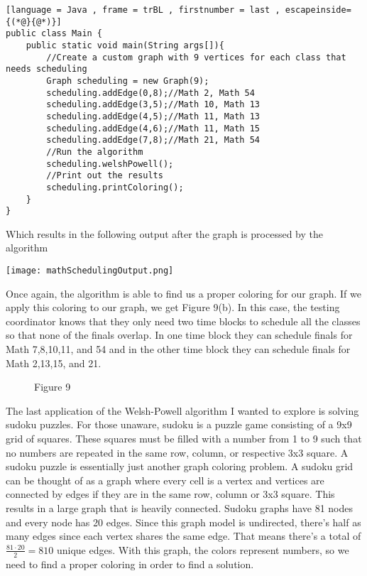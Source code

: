 \documentclass[12pt, letterpaper]{article}
\begin{document}
\begin{lstlisting}[language = Java , frame = trBL , firstnumber = last , escapeinside={(*@}{@*)}]
public class Main {
    public static void main(String args[]){
        //Create a custom graph with 9 vertices for each class that needs scheduling
        Graph scheduling = new Graph(9);
        scheduling.addEdge(0,8);//Math 2, Math 54
        scheduling.addEdge(3,5);//Math 10, Math 13
        scheduling.addEdge(4,5);//Math 11, Math 13
        scheduling.addEdge(4,6);//Math 11, Math 15
        scheduling.addEdge(7,8);//Math 21, Math 54
        //Run the algorithm
        scheduling.welshPowell();
        //Print out the results
        scheduling.printColoring();
    }
}
\end{lstlisting}


Which results in the following output after the graph is processed by the algorithm


\begin{center}
\texttt{[image: mathSchedulingOutput.png]}
\end{center}


Once again, the algorithm is able to find us a proper coloring for our graph. If we apply this coloring to our graph, we get Figure 9(b). In this case, the testing coordinator knows that they only need two time blocks to schedule all the classes so that none of the finals overlap. In one time block they can schedule finals for Math 7,8,10,11, and 54 and in the other time block they can schedule finals for Math 2,13,15, and 21.


\begin{figure}[H]%
\begin{center}
	\qquad
{}%
	\caption*{Figure 9}
\end{center}
\end{figure}


The last application of the Welsh-Powell algorithm I wanted to explore is solving sudoku puzzles. For those unaware, sudoku is a puzzle game consisting of a 9x9 grid of squares. These squares must be filled with a number from 1 to 9 such that no numbers are repeated in the same row, column, or respective 3x3 square. A sudoku puzzle is essentially just another graph coloring problem. A sudoku grid can be thought of as a graph where every cell is a vertex and vertices are connected by edges if they are in the same row, column or 3x3 square. This results in a large graph that is heavily connected. Sudoku graphs have 81 nodes and every node has 20 edges. Since this graph model is undirected, there's half as many edges since each vertex shares the same edge. That means there's a total of $\frac{81\cdot 20}{2}= 810$ unique edges. With this graph, the colors represent numbers, so we need to find a proper coloring in order to find a solution.
\end{document}
